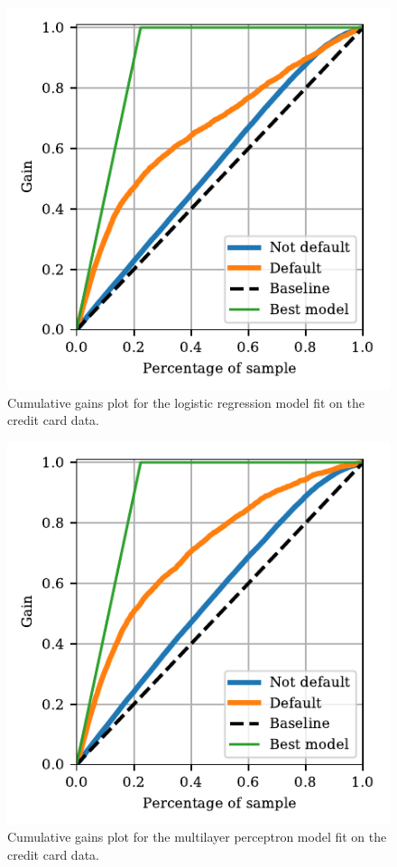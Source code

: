 \documentclass[a4paper, 11pt, twocolumn]{article}
\begin{document}
\begin{figure}[H]
	\includegraphics[scale=1]{figures/cumulative_gain_logreg.pdf}
	\caption{Cumulative gains plot for the logistic regression model fit on the
	credit card data.}
	\label{fig:logreg_gain}
\end{figure}




\begin{figure}[H]
	\includegraphics[scale=1]{figures/cumulative_gain_NN.pdf}
	\caption{Cumulative gains plot for the multilayer perceptron model fit on
	the credit card data.}
	\label{fig:nn_gain}
\end{figure}
\end{document}
